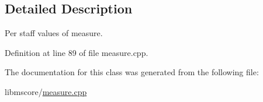 \subsection{Detailed Description}
Per staff values of measure. 

Definition at line 89 of file measure.\+cpp.



The documentation for this class was generated from the following file\+:\begin{DoxyCompactItemize}
\item 
libmscore/\hyperlink{measure_8cpp}{measure.\+cpp}\end{DoxyCompactItemize}
